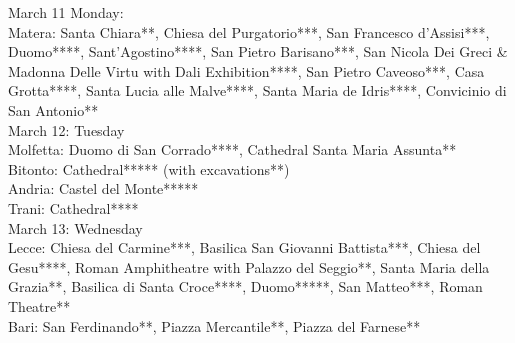 March 11 Monday:\\
Matera: Santa Chiara**, Chiesa del Purgatorio***, San Francesco d'Assisi***, Duomo****, Sant'Agostino****, San Pietro Barisano***, San Nicola Dei Greci \& Madonna Delle Virtu with Dali Exhibition****, San Pietro Caveoso***, Casa Grotta****, Santa Lucia alle Malve****, Santa Maria de Idris****, Convicinio di San Antonio**\\

March 12: Tuesday\\
Molfetta: Duomo di San Corrado****, Cathedral Santa Maria Assunta**\\
Bitonto: Cathedral***** (with excavations**)\\
Andria: Castel del Monte*****\\
Trani: Cathedral****\\

March 13: Wednesday\\
Lecce: Chiesa del Carmine***, Basilica San Giovanni Battista***, Chiesa del Gesu****, Roman Amphitheatre with Palazzo del Seggio**, Santa Maria della Grazia**, Basilica di Santa Croce****, Duomo*****, San Matteo***, Roman Theatre**\\
Bari: San Ferdinando**, Piazza Mercantile**, Piazza del Farnese**\\

